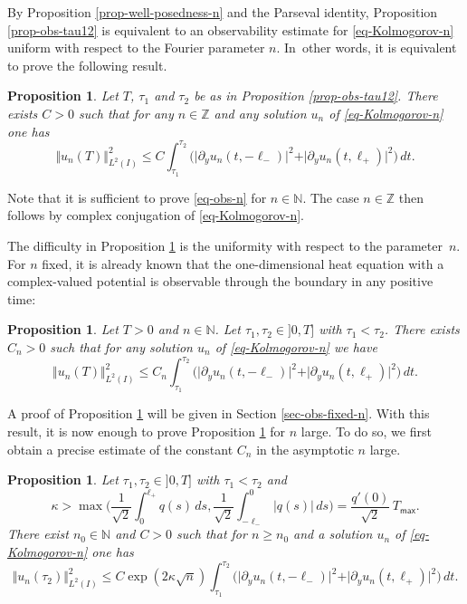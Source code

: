 \documentclass[11pt]{article}
\numberwithin{equation}{section}
\theoremstyle{plain}
\newtheorem{proposition}[theorem]{Proposition}
\theoremstyle{definition}
\newcommand{\abs}[1]{\vert #1\vert}
\newcommand{\nr}[1]{\Vert #1\Vert}
\newcommand{\1}{\mathds 1}
\newcommand{\N}{\mathbb{N}}
\newcommand{\Z}{\mathbb{Z}}
\newcommand{\Tmax}{T_{\mathsf{max}}}
\begin{document}
By Proposition \ref{prop-well-posedness-n} and the Parseval identity, Proposition \ref{prop-obs-tau12} is equivalent to an observability estimate for \eqref{eq-Kolmogorov-n} uniform with respect to the Fourier parameter $n$. In~other words, it is equivalent to prove the following result.

\begin{proposition} \label{prop-observability-n}
Let $T$, $\tau_1$ and $\tau_2$ be as in Proposition \ref{prop-obs-tau12}. There exists $C>0$ such that for any $n \in \mathbb{Z}$ and any solution $u_n$ of \eqref{eq-Kolmogorov-n} one has
\begin{equation} \label{eq-obs-n}
\Vert u_n(T) \Vert_{L^2(I)}^2 \leq C \int_{\tau_1}^{\tau_2} \bigl(\vert \partial_y u_n(t,-\ell_-)\vert^2 + \vert \partial_y u_n(t,\ell_+) \vert^2 \bigr) \, dt.
\end{equation}
\end{proposition}

Note that it is sufficient to prove \eqref{eq-obs-n} for $n \in \N$. The case $n \in \Z$ then follows by complex conjugation of \eqref{eq-Kolmogorov-n}.

The difficulty in Proposition \ref{prop-observability-n} is the uniformity with respect to the parameter~$n$. For $n$ fixed, it is already known that the one-dimensional heat equation with a complex-valued potential is observable through the boundary in any positive time:

\begin{proposition} \label{prop-obs-fix-n}
Let $T>0$ and $n \in \mathbb{N}$. Let $\tau_1,\tau_2 \in{}]0,T]$ with $\tau_1 < \tau_2$. There exists $C_n > 0$ such that for any solution $u_n$ of \eqref{eq-Kolmogorov-n} we have
\begin{equation} \label{equ_obsineq_fixedn}
\nr{u_n(T)}_{L^2(I)}^2 \leq C_n \int_{\tau_1}^{\tau_2} \bigl(\abs {\partial_y u_n(t,-\ell_-)}^2 + \abs{\partial_y u_n(t,\ell_+)}^2 \bigr) \, dt.
\end{equation}
\end{proposition}

A proof of Proposition \ref{prop-obs-fix-n} will be given in Section \ref{sec-obs-fixed-n}. With this result, it is now enough to prove Proposition \ref{prop-observability-n} for $n$ large. To do so, we first obtain a precise estimate
of the constant $C_n$ in the asymptotic $n$ large.

\begin{proposition} \label{prop-obs-large-n}
Let $\tau_1,\tau_2 \in{}]0,T]$ with $\tau_1 < \tau_2$ and
\[
\kappa > \max \biggl(\frac 1 {\sqrt 2} \int_0^{\ell_+} q(s) \, ds , \frac 1 {\sqrt 2} \int_{-\ell_-}^{0} \vert q(s)\vert \, ds \biggr) = \frac {q'(0)}{\sqrt 2}\, \Tmax.
\]
There exist $n_0 \in \N$ and $C > 0$ such that for $n \geq n_0$ and a solution $u_n$ of \eqref{eq-Kolmogorov-n} one has
\[
\nr{u_n(\tau_2)}_{L^2(I)}^2 \leq C \exp(2 \kappa \sqrt{n}) {\int_{\tau_1}^{\tau_2} \bigl(\vert \partial_y u_n(t,-\ell_-)\vert^2 + \vert \partial_y u_n(t,\ell_+) \vert^2 \bigr) \, dt}.
\]
\end{proposition}
\end{document}
